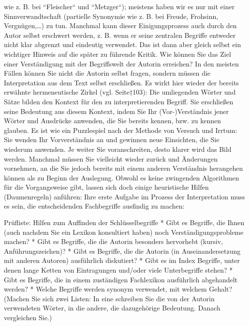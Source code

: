 \documentclass[]{book}
\theoremstyle{definition}
\theoremstyle{definition}
\theoremstyle{definition}
\theoremstyle{remark}
\begin{document}
wie z. B. bei ``Fleischer`` und ``Metzger``); meistens haben wir es nur
mit einer Sinnverwandtschaft (partielle Synonymie wie z. B. bei Freude,
Frohsinn, Vergnügen,\ldots{}) zu tun. Manchmal kann dieser
Einigungsprozess auch durch den Autor selbst erschwert werden, z. B.
wenn er seine zentralen Begriffe entweder nicht klar abgrenzt und
eindeutig verwendet. Das ist dann aber gleich selbst ein wichtiger
Hinweis auf die später zu führende Kritik. Wie können Sie das Ziel einer
Verständigung mit der Begriffswelt der Autorin erreichen? In den meisten
Fällen können Sie nicht die Autorin selbst fragen, sondern müssen die
Interpretation aus dem Text selbst erschließen. Es wirkt hier wieder der
bereits erwähnte hermeneutische Zirkel (vgl. Seite†103): Die umliegenden
Wörter und Sätze bilden den Kontext für den zu interpretierenden
Begriff. Sie erschließen seine Bedeutung aus diesem Kontext, indem Sie
Ihr (Vor-)Verständnis jener Wörter und Ausdrücke anwenden, die Sie
bereits kennen, bzw. zu kennen glauben. Es ist wie ein Puzzlespiel nach
der Methode von Versuch und Irrtum: Sie wenden Ihr Vorverständnis an und
gewinnen neue Einsichten, die Sie wiederum anwenden. Je weiter Sie
voranschreiten, desto klarer wird das Bild werden. Manchmal müssen Sie
vielleicht wieder zurück und Änderungen vornehmen, an die Sie jedoch
bereits mit einem anderen Verständnis herangehen können als zu Beginn
der Auslegung. Obwohl es keine zwingenden Algorithmen für die
Vorgangsweise gibt, lassen sich doch einige heuristische Hilfen
(Daumenregeln) anführen: Ihre erste Aufgabe im Prozess der
Interpretation muss es sein, die entscheidenden Fachbegriffe ausfindig
zu machen:

Prüfliste: Hilfen zum Auffinden der Schlüsselbegriffe * Gibt es
Begriffe, die Ihnen (auch nachdem Sie ein Lexikon konsultiert haben)
noch Verständigungsprobleme machen? * Gibt es Begriffe, die die Autorin
besonders hervorhebt (kursiv, Anführungszeichen)? * Gibt es Begriffe,
die die Autorin (in Auseinandersetzung mit anderen Autoren) ausführlich
diskutiert? * Gibt es im Index Begriffe, unter denen lange Ketten von
Eintragungen und/oder viele Unterbegriffe stehen? * Gibt es Begriffe,
die in einem zuständigen Fachlexikon ausführlich abgehandelt werden? *
Welche Begriffe werden synonym verwendet, mit welchem Gehalt? (Machen
Sie sich zwei Listen: In eine schreiben Sie die von der Autorin
verwendeten Wörter, in die andere, die dazugehörige Bedeutung. Danach
vergleichen Sie.)
\end{document}
